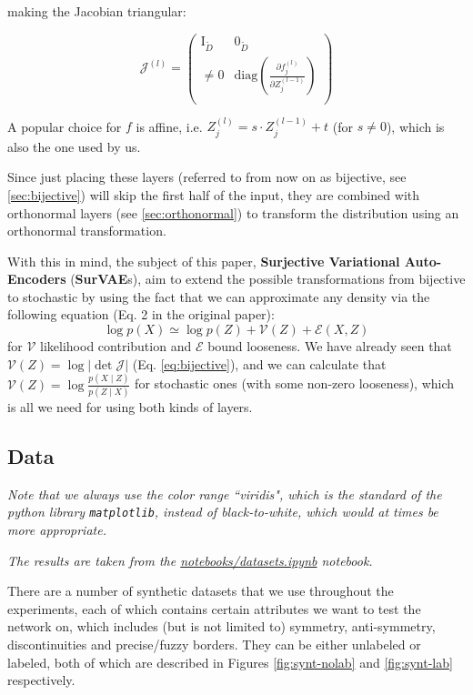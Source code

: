 making the Jacobian triangular:

\[\mathcal{J}^{(l)} = \begin{pmatrix}
  \mathrm{I}_{\tilde D} & \mathrm{0}_{\tilde D} \\
  \neq 0 & \mathrm{diag}\left(\frac{\partial f_j^{(l)}}{ \partial Z_j^{(l-1)}}\right) \\
\end{pmatrix}\]

A popular choice for $f$ is affine, i.e. \(Z_{j}^{(l)} = s \cdot Z_j^{(l-1)} + t\) (for $s \neq 0$), which is also the one used by us.

Since just placing these layers (referred to from now on as bijective, see \ref{sec:bijective}) will skip the first half of the input, they are combined with orthonormal layers (see \ref{sec:orthonormal}) to transform the distribution using an orthonormal transformation.

With this in mind, the subject of this paper, \textbf{Surjective Variational Auto-Encoders} (\textbf{SurVAE}s), aim to extend the possible transformations from bijective to stochastic by using the fact that we can approximate any density via the following equation (Eq. 2 in the original paper): $$\log p(X) \simeq \log p(Z) + \mathcal{V}(Z) + \mathcal{E}(X, Z)$$
for $\mathcal{V}$ likelihood contribution and $\mathcal{E}$ bound looseness.
We have already seen that $\mathcal{V}(Z) = \log |\det \mathcal{J}|$ (Eq. \ref{eq:bijective}), and we can calculate that $\mathcal{V}(Z) = \log \frac{p(X \mid Z)}{p(Z \mid X)}$ for stochastic ones (with some non-zero looseness), which is all we need for using both kinds of layers.

\subsection{Data}

\textit{Note that we always use the color range ``viridis", which is the standard of the python library \texttt{matplotlib}, instead of black-to-white, which would at times be more appropriate.}



\textit{The results are taken from the \href{https://github.com/xiaoxiae/GNNFinal2024/blob/main/notebooks/datasets.ipynb}{notebooks/datasets.ipynb} notebook.}

There are a number of synthetic datasets that we use throughout the experiments, each of which contains certain attributes we want to test the network on, which includes (but is not limited to) symmetry, anti-symmetry, discontinuities and precise/fuzzy borders.
They can be either unlabeled or labeled, both of which are described in Figures \ref{fig:synt-nolab} and \ref{fig:synt-lab} respectively.

